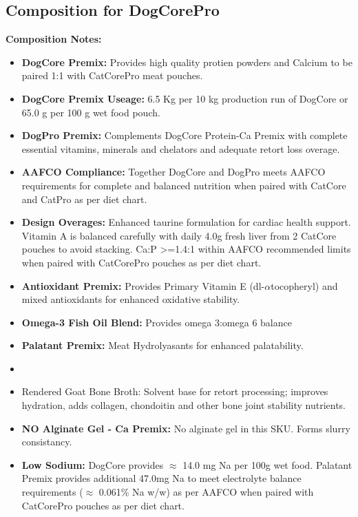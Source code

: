 \subsection*{Composition for DogCorePro}
\noindent\textbf{Composition Notes:}
\begin{itemize}
\item\textbf {DogCore Premix: } Provides high quality protien powders and Calcium to be paired 1:1 with CatCorePro meat pouches.
\item \textbf{DogCore Premix Useage: }6.5 Kg per 10 kg production run of DogCore or 65.0 g per 100 g wet food pouch.
\item \textbf{DogPro Premix: } Complements DogCore Protein-Ca Premix with complete essential vitamins, minerals and chelators and adequate retort loss overage. 
\item\textbf{AAFCO Compliance: } Together DogCore and DogPro meets AAFCO requirements for complete and balanced nutrition when paired with CatCore and CatPro as per diet chart. 
\item\textbf{Design Overages: }Enhanced taurine formulation for cardiac health support. Vitamin A is balanced carefully with daily 4.0g fresh liver from 2 CatCore pouches to avoid stacking. Ca:P >=1.4:1 within AAFCO recommended limits when paired with CatCorePro pouches as per diet chart. 
\item \textbf{Antioxidant Premix: } Provides Primary Vitamin E (dl-$\alpha$tocopheryl) and mixed antioxidants for enhanced oxidative stability.
\item \textbf{Omega-3 Fish Oil Blend:} Provides omega 3:omega 6  balance
\item \textbf{Palatant Premix: } Meat Hydrolyasants for enhanced palatability.
\item\item{Rendered Goat Bone Broth: } Solvent base for retort processing; improves hydration, adds collagen, chondoitin and other bone joint stability nutrients. 
\item \textbf{NO Alginate Gel - Ca Premix:} No alginate gel in this SKU. Forms slurry consistancy. 
\item \textbf{Low Sodium:} DogCore provides $\approx$ 14.0 mg Na per 100g wet food. Palatant Premix provides additional 47.0mg Na to meet electrolyte balance requirements ($\approx$ 0.061\% Na w/w) as per AAFCO when paired with CatCorePro pouches as per diet chart. 
\end{itemize}